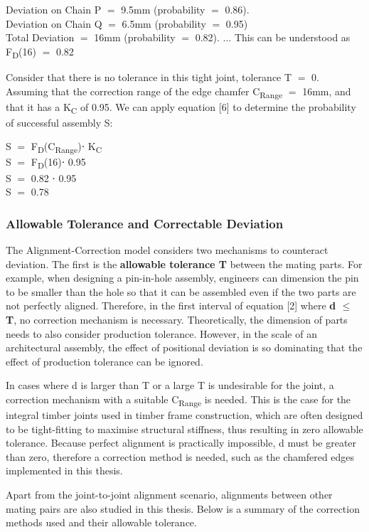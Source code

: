 \documentclass[11pt]{book}
\begin{document}
Deviation on Chain P $=$ 9.5mm (probability $=$ 0.86). \\ Deviation on Chain Q $=$ 6.5mm (probability $=$ 0.95) \\ Total Deviation $=$ 16mm (probability $=$ 0.82). $\ldots$ This can be understood as F\textsubscript{D}(16) $=$ 0.82

Consider that there is no tolerance in this tight joint, tolerance T $=$ 0. Assuming that the correction range of the edge chamfer C\textsubscript{Range} $=$ 16mm, and that it has a K\textsubscript{C} of 0.95. We can apply equation [6] to determine the probability of successful assembly S:

S $=$ F\textsubscript{D}(C\textsubscript{Range})⋅ K\textsubscript{C} \\ S $=$ F\textsubscript{D}(16)⋅ 0.95 \\ S $=$ 0.82 ⋅ 0.95 \\ S $=$ 0.78

\subsubsection{Allowable Tolerance and Correctable Deviation}

The Alignment-Correction model considers two mechanisms to counteract deviation. The first is the \textbf{allowable tolerance T} between the mating parts. For example, when designing a pin-in-hole assembly, engineers can dimension the pin to be smaller than the hole so that it can be assembled even if the two parts are not perfectly aligned. Therefore, in the first interval of equation [2] where \textbf{d $\leq$ T}, no correction mechanism is necessary. Theoretically, the dimension of parts needs to also consider production tolerance. However, in the scale of an architectural assembly, the effect of positional deviation is so dominating that the effect of production tolerance can be ignored.

In cases where d is larger than T or a large T is undesirable for the joint, a correction mechanism with a suitable C\textsubscript{Range} is needed. This is the case for the integral timber joints used in timber frame construction, which are often designed to be tight-fitting to maximise structural stiffness, thus resulting in zero allowable tolerance. Because perfect alignment is practically impossible, d must be greater than zero, therefore a correction method is needed, such as the chamfered edges implemented in this thesis.

Apart from the joint-to-joint alignment scenario, alignments between other mating pairs are also studied in this thesis. Below is a summary of the correction methods used and their allowable tolerance. 
\end{document}

